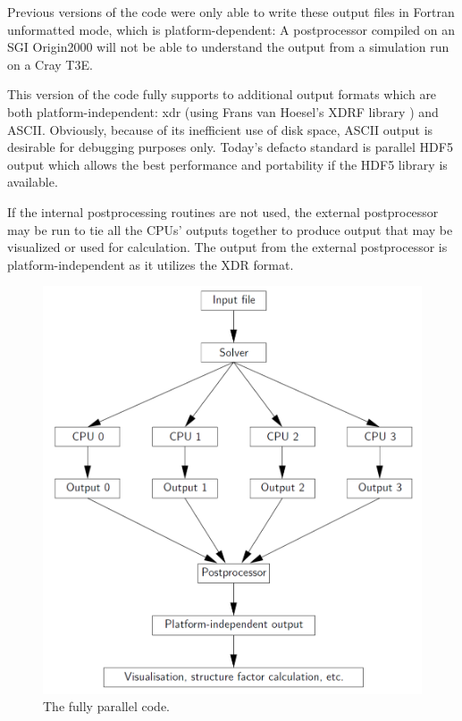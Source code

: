 \documentclass[a4paper]{article}
\begin{document}
Previous versions of the code were only able to write these output files in
Fortran unformatted mode, which is platform-dependent: A postprocessor compiled
on an SGI Origin2000 will not be able to understand the output from a
simulation run on a Cray T3E.

This version of the code fully supports to additional output formats which are
both platform-independent: xdr \cite{bib:rfc1832} (using Frans van Hoesel's
XDRF library \cite{bib:Hoesel}) and ASCII. Obviously, because of its
inefficient use of disk space, ASCII output is desirable for debugging purposes
only. Today's defacto standard is parallel HDF5 output which allows the best
performance and portability if the HDF5 library is available.

If the internal postprocessing routines are not used, the external
postprocessor may be run to tie all the CPUs' outputs together to produce
output that may be visualized or used for calculation. The output from the
external postprocessor is platform-independent as it utilizes the XDR format.

\begin{figure}[!hp]
\centering
\includegraphics[width=1.0\textwidth]{lb3d_flow.pdf}
\caption{The fully parallel code.
\label{fig:parallel}
}
\end{figure}
\end{document}
